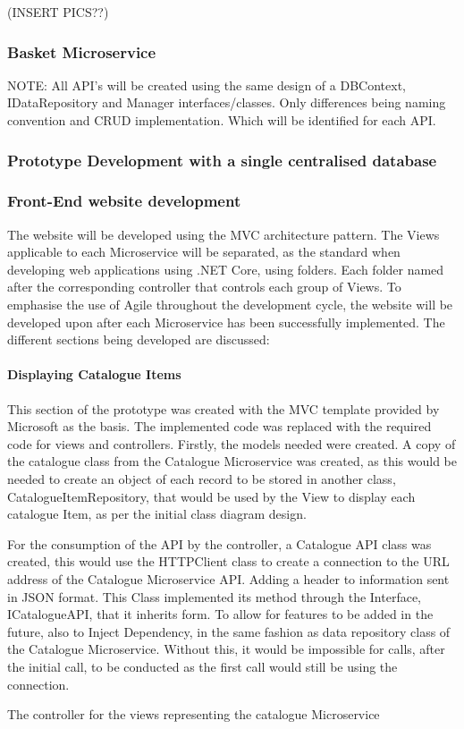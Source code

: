 (INSERT PICS??)

\subsubsection{Basket Microservice}

NOTE: All API's will be created using the same design of a DBContext, IDataRepository and Manager interfaces/classes. Only differences being naming convention and CRUD implementation. Which will be identified for each API.
\subsubsection{Prototype Development with a single centralised database}
\subsubsection{Front-End website development}
The website will be developed using the MVC architecture pattern. The Views applicable to each Microservice will be separated, as the standard when developing web applications using .NET Core, using folders. Each folder named after the corresponding controller that controls each group of Views.
To emphasise the use of Agile throughout the development cycle, the website will be developed upon after each Microservice has been successfully implemented. The different sections being developed are discussed:
\paragraph{Displaying Catalogue Items}
This section of the prototype was created with the MVC template provided by Microsoft as the basis. The implemented code was replaced with the required code for views and controllers.
Firstly, the models needed were created. A copy of the catalogue class from the Catalogue Microservice was created, as this would be needed to create an object of each record to be stored in another class, CatalogueItemRepository, that would be used by the View to display each catalogue Item, as per the initial class diagram design.

For the consumption of the API by the controller, a Catalogue API class was created, this would use the HTTPClient class to create a connection to the URL address of the Catalogue Microservice API. Adding a header to information sent in JSON format. This Class implemented its method through the Interface, ICatalogueAPI, that it inherits form. To allow for features to be added in the future, also to Inject Dependency, in the same fashion as data repository class of the Catalogue Microservice. Without this, it would be impossible for calls, after the initial call, to be conducted as the first call would still be using the connection. 

The controller for the views representing the catalogue Microservice 